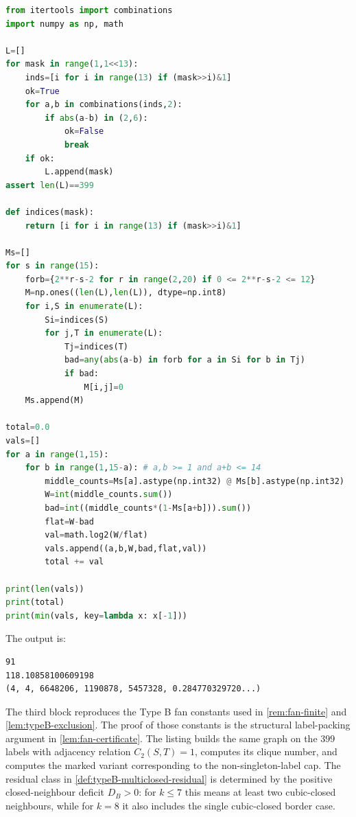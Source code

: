 \documentclass[11pt]{article}
\begin{document}
\begin{lstlisting}[language=Python]
from itertools import combinations
import numpy as np, math

L=[]
for mask in range(1,1<<13):
    inds=[i for i in range(13) if (mask>>i)&1]
    ok=True
    for a,b in combinations(inds,2):
        if abs(a-b) in (2,6):
            ok=False
            break
    if ok:
        L.append(mask)
assert len(L)==399

def indices(mask):
    return [i for i in range(13) if (mask>>i)&1]

Ms=[]
for s in range(15):
    forb={2**r-s-2 for r in range(2,20) if 0 <= 2**r-s-2 <= 12}
    M=np.ones((len(L),len(L)), dtype=np.int8)
    for i,S in enumerate(L):
        Si=indices(S)
        for j,T in enumerate(L):
            Tj=indices(T)
            bad=any(abs(a-b) in forb for a in Si for b in Tj)
            if bad:
                M[i,j]=0
    Ms.append(M)

total=0.0
vals=[]
for a in range(1,15):
    for b in range(1,15-a): # a,b >= 1 and a+b <= 14
        middle_counts=Ms[a].astype(np.int32) @ Ms[b].astype(np.int32)
        W=int(middle_counts.sum())
        bad=int((middle_counts*(1-Ms[a+b])).sum())
        flat=W-bad
        val=math.log2(W/flat)
        vals.append((a,b,W,bad,flat,val))
        total += val

print(len(vals))
print(total)
print(min(vals, key=lambda x: x[-1]))
\end{lstlisting}

The output is:
\begin{lstlisting}
91
118.10858100609198
(4, 4, 6648206, 1190878, 5457328, 0.284770329720...)
\end{lstlisting}

The third block reproduces the Type B fan constants used in
\cref{rem:fan-finite} and \cref{lem:typeB-exclusion}.  The proof of those
constants is the structural label-packing argument in
\cref{lem:fan-certificate}.  The listing builds the same graph on the $399$
labels with adjacency relation $C_2(S,T)=1$, computes its clique number, and
computes the marked variant corresponding to the non-singleton-label cap.  The
residual class in \cref{def:typeB-multiclosed-residual} is determined by the
positive closed-neighbour deficit $D_B>0$: for $k\le7$ this means at least two
cubic-closed neighbours, while for $k=8$ it also includes the single
cubic-closed border case.
\end{document}
